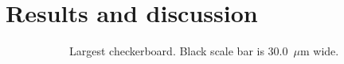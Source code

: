 \section*{Results and discussion}
\begin{figure}[!t]	
    \centering
    \begin{subfigure}[t]{0.24\linewidth}
    	\centering
    	\caption{Largest checkerboard. Black scale bar is 30.0~$\mu$m wide.}
    	\label{fig:b2d5_q5}
    \end{subfigure}
    \hfill
    \begin{subfigure}[t]{0.24\linewidth}
    	\centering

\end{subfigure}
\end{figure}
